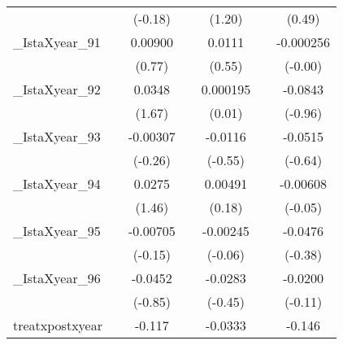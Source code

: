 {\begin{tabular}{l*{6}{c}}
            &                     &     (-0.18)         &                     &      (1.20)         &                     &      (0.49)         \\
[1em]
\_IstaXyear\_91&                     &     0.00900         &                     &      0.0111         &                     &   -0.000256         \\
            &                     &      (0.77)         &                     &      (0.55)         &                     &     (-0.00)         \\
[1em]
\_IstaXyear\_92&                     &      0.0348         &                     &    0.000195         &                     &     -0.0843         \\
            &                     &      (1.67)         &                     &      (0.01)         &                     &     (-0.96)         \\
[1em]
\_IstaXyear\_93&                     &    -0.00307         &                     &     -0.0116         &                     &     -0.0515         \\
            &                     &     (-0.26)         &                     &     (-0.55)         &                     &     (-0.64)         \\
[1em]
\_IstaXyear\_94&                     &      0.0275         &                     &     0.00491         &                     &    -0.00608         \\
            &                     &      (1.46)         &                     &      (0.18)         &                     &     (-0.05)         \\
[1em]
\_IstaXyear\_95&                     &    -0.00705         &                     &    -0.00245         &                     &     -0.0476         \\
            &                     &     (-0.15)         &                     &     (-0.06)         &                     &     (-0.38)         \\
[1em]
\_IstaXyear\_96&                     &     -0.0452         &                     &     -0.0283         &                     &     -0.0200         \\
            &                     &     (-0.85)         &                     &     (-0.45)         &                     &     (-0.11)         \\
[1em]
treatxpostxyear&                     &      -0.117\sym{***}&                     &     -0.0333         &                     &      -0.146\sym{***}\\

\end{tabular}}

